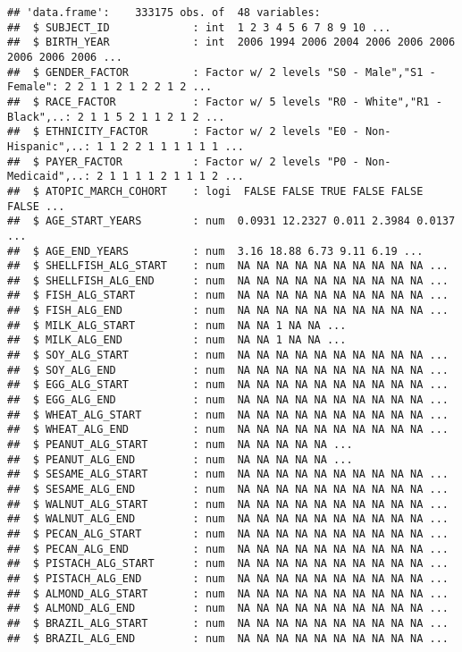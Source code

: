 \documentclass[
]{article}
\begin{document}
\begin{verbatim}
## 'data.frame':    333175 obs. of  48 variables:
##  $ SUBJECT_ID             : int  1 2 3 4 5 6 7 8 9 10 ...
##  $ BIRTH_YEAR             : int  2006 1994 2006 2004 2006 2006 2006 2006 2006 2006 ...
##  $ GENDER_FACTOR          : Factor w/ 2 levels "S0 - Male","S1 - Female": 2 2 1 1 2 1 2 2 1 2 ...
##  $ RACE_FACTOR            : Factor w/ 5 levels "R0 - White","R1 - Black",..: 2 1 1 5 2 1 1 2 1 2 ...
##  $ ETHNICITY_FACTOR       : Factor w/ 2 levels "E0 - Non-Hispanic",..: 1 1 2 2 1 1 1 1 1 1 ...
##  $ PAYER_FACTOR           : Factor w/ 2 levels "P0 - Non-Medicaid",..: 2 1 1 1 1 2 1 1 1 2 ...
##  $ ATOPIC_MARCH_COHORT    : logi  FALSE FALSE TRUE FALSE FALSE FALSE ...
##  $ AGE_START_YEARS        : num  0.0931 12.2327 0.011 2.3984 0.0137 ...
##  $ AGE_END_YEARS          : num  3.16 18.88 6.73 9.11 6.19 ...
##  $ SHELLFISH_ALG_START    : num  NA NA NA NA NA NA NA NA NA NA ...
##  $ SHELLFISH_ALG_END      : num  NA NA NA NA NA NA NA NA NA NA ...
##  $ FISH_ALG_START         : num  NA NA NA NA NA NA NA NA NA NA ...
##  $ FISH_ALG_END           : num  NA NA NA NA NA NA NA NA NA NA ...
##  $ MILK_ALG_START         : num  NA NA 1 NA NA ...
##  $ MILK_ALG_END           : num  NA NA 1 NA NA ...
##  $ SOY_ALG_START          : num  NA NA NA NA NA NA NA NA NA NA ...
##  $ SOY_ALG_END            : num  NA NA NA NA NA NA NA NA NA NA ...
##  $ EGG_ALG_START          : num  NA NA NA NA NA NA NA NA NA NA ...
##  $ EGG_ALG_END            : num  NA NA NA NA NA NA NA NA NA NA ...
##  $ WHEAT_ALG_START        : num  NA NA NA NA NA NA NA NA NA NA ...
##  $ WHEAT_ALG_END          : num  NA NA NA NA NA NA NA NA NA NA ...
##  $ PEANUT_ALG_START       : num  NA NA NA NA NA ...
##  $ PEANUT_ALG_END         : num  NA NA NA NA NA ...
##  $ SESAME_ALG_START       : num  NA NA NA NA NA NA NA NA NA NA ...
##  $ SESAME_ALG_END         : num  NA NA NA NA NA NA NA NA NA NA ...
##  $ WALNUT_ALG_START       : num  NA NA NA NA NA NA NA NA NA NA ...
##  $ WALNUT_ALG_END         : num  NA NA NA NA NA NA NA NA NA NA ...
##  $ PECAN_ALG_START        : num  NA NA NA NA NA NA NA NA NA NA ...
##  $ PECAN_ALG_END          : num  NA NA NA NA NA NA NA NA NA NA ...
##  $ PISTACH_ALG_START      : num  NA NA NA NA NA NA NA NA NA NA ...
##  $ PISTACH_ALG_END        : num  NA NA NA NA NA NA NA NA NA NA ...
##  $ ALMOND_ALG_START       : num  NA NA NA NA NA NA NA NA NA NA ...
##  $ ALMOND_ALG_END         : num  NA NA NA NA NA NA NA NA NA NA ...
##  $ BRAZIL_ALG_START       : num  NA NA NA NA NA NA NA NA NA NA ...
##  $ BRAZIL_ALG_END         : num  NA NA NA NA NA NA NA NA NA NA ...

\end{verbatim}
\end{document}
